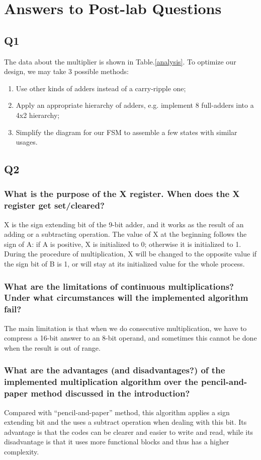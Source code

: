 \documentclass[11pt]{article}
\begin{document}
\section{Answers to Post-lab Questions}
\subsection{Q1}
The data about the multiplier is shown in Table.\ref{analysis}. To optimize our design, we may take 3 possible methods:
\begin{enumerate}
    \item Use other kinds of adders instead of a carry-ripple one;
    \item Apply an appropriate hierarchy of adders, e.g. implement 8 full-adders into a 4x2 hierarchy;
    \item Simplify the diagram for our FSM to assemble a few states with similar usages. 
\end{enumerate}

\subsection{Q2}
\subsubsection{What is the purpose of the X register. When does the X register get set/cleared?}
X is the sign extending bit of the 9-bit adder, and it works as the result of an adding or a subtracting operation. The value of X at the beginning follows the sign of A: if A is positive, X is initialized to 0; otherwise it is initialized to 1. During the procedure of multiplication, X will be changed to the opposite value if the sign bit of B is 1, or will stay at its initialized value for the whole process.

\subsubsection{What are the limitations of continuous multiplications? Under what circumstances will the implemented algorithm fail?}
The main limitation is that when we do consecutive multiplication, we have to compress a 16-bit answer to an 8-bit operand, and sometimes this cannot be done when the result is out of range.

\subsubsection{What are the advantages (and disadvantages?) of the implemented multiplication algorithm over the pencil-and-paper method discussed in the introduction?}
Compared with ``pencil-and-paper'' method, this algorithm applies a sign extending bit and the uses a subtract operation when dealing with this bit. Its advantage is that the codes can be clearer and easier to write and read, while its disadvantage is that it uses more functional blocks and thus has a higher complexity.
\end{document}
